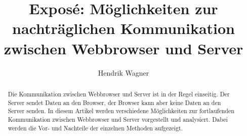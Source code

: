 \documentclass[sigplan,screen]{acmart}
\begin{document}

\title{Exposé: Möglichkeiten zur nachträglichen Kommunikation zwischen Webbrowser und Server}

\author{Hendrik Wagner}



\begin{abstract}
  Die Kommunikation zwischen Webbrowser und Server ist in der Regel
  einseitig.
  Der Server sendet Daten an den Browser, der Browser kann aber keine
  Daten an den Server senden.
  In diesem Artikel werden verschiedene Möglichkeiten zur fortlaufenden
  Kommunikation zwischen Webbrowser und Server vorgestellt und analysiert. 
  Dabei werden die Vor- und Nachteile der einzelnen Methoden aufgezeigt.
\end{abstract}
\end{document}
